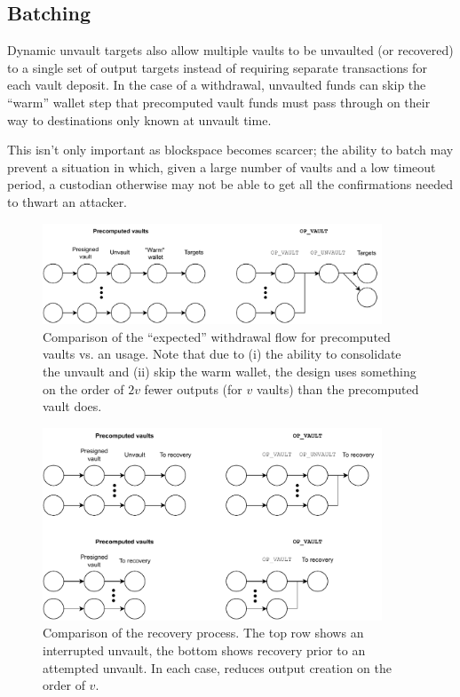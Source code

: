 \documentclass[10pt]{article}
\begin{document}
\subsection*{Batching}

Dynamic unvault targets also allow multiple vaults to be unvaulted (or recovered) to a
single set of output targets instead of requiring separate transactions for each vault
deposit. In the case of a withdrawal, unvaulted funds can skip the ``warm'' wallet step
that precomputed vault funds must pass through on their way to destinations
only known at unvault time. 

This isn't only important as blockspace becomes scarcer;
the ability to batch may prevent a situation in which, given a large number of vaults
and a low timeout period, a custodian otherwise may not be able to get all the
confirmations needed to thwart an attacker.

\begin{figure}[H]
\includegraphics[width=0.9\textwidth]{withdrawal-comparison.pdf}
\centering
\caption{Comparison of the ``expected'' withdrawal flow for precomputed vaults vs. an
  \opv{} usage. Note that due to (i) the ability to consolidate the unvault and (ii) skip the
  warm wallet, the \opv{} design uses something on the order of $2v$ fewer outputs (for
  $v$ vaults) than the precomputed vault does.}
\end{figure}


\begin{figure}[H]
\includegraphics[width=0.9\textwidth]{recovery-comparison.pdf}
\centering
\caption{
  Comparison of the recovery process. The top row shows an interrupted unvault, the
  bottom shows recovery prior to an attempted unvault. In each case, \opv{} reduces
  output creation on the order of $v$.
}
\end{figure}
\end{document}
